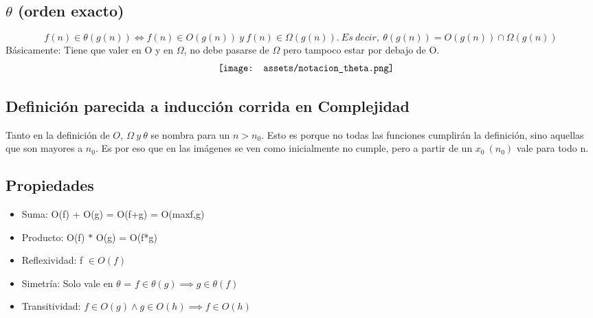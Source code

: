 \documentclass[10pt,a4paper]{article}
\begin{document}
\subsection*{\(\theta\) (orden exacto)}
\[f (n) \in \theta(g(n)) \iff f (n) \in O(g(n)) \ y \ f (n) \in \Omega(g(n)).\ Es \ decir, \ \theta(g(n)) = O(g(n)) \cap \Omega(g(n))\]
Básicamente: Tiene que valer en O y en \(\Omega\), no debe pasarse de \(\Omega\) pero tampoco estar por debajo de O.
\[\begin{minipage}[b]{0.5\textwidth}
    \texttt{[image: assets/notacion\_theta.png]}
\end{minipage}\]
\subsection*{Definición parecida a inducción corrida en Complejidad}
Tanto en la definición de \(O, \ \Omega \ y \ \theta\) se nombra para un \(n > n_{0}\). Esto es porque no todas las funciones cumplirán la definición, sino aquellas que son mayores a \(n_{0}\). Es por eso que en las imágenes se ven como inicialmente no cumple, pero a partir de un \(x_{0} \ (n_{0})\) vale para todo n.
\subsection*{Propiedades}
\begin{itemize}
    \item Suma: O(f) + O(g) = O(f+g) = O(max{f,g})
    \item Producto: O(f) \(\ast\) O(g) = O(f*g)
    \item Reflexividad: f \(\in O(f)\)
    \item Simetría: Solo vale en \(\theta\) = \(f \in \theta(g) \implies g \in \theta(f)\)
    \item Transitividad: \(f \in O(g) \land g \in O(h) \implies f \in O(h)\)
\end{itemize}
\end{document}
